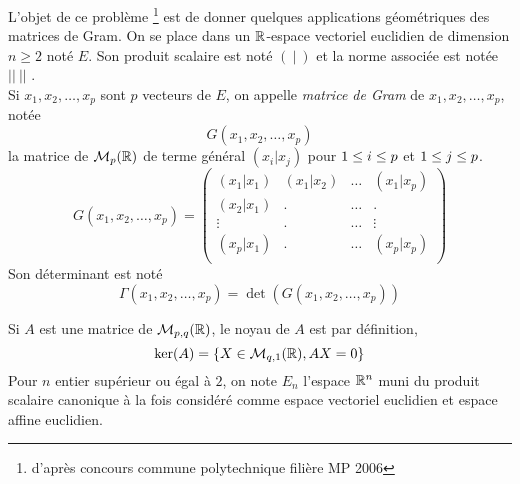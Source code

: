 L'objet de ce problème \footnote{d'après concours commune polytechnique filière MP 2006} est de donner quelques applications géométriques des matrices de Gram. On se place dans un $\mathbb{R}$-espace vectoriel euclidien de dimension $n\geq 2$ noté  $E$. Son produit scalaire est noté $(\ |\ )$ et la norme associée est notée $||\ ||$ .\\
Si $x_1,x_2,\dots, x_p$ sont $p$ vecteurs de $E$, on appelle \emph{matrice de Gram} de $x_1,x_2,\dots, x_p$, notée
\begin{displaymath}
 G(x_1,x_2,\dots, x_p)
\end{displaymath}
la matrice de $\mathcal{M}_p(\mathbb{R})$ de terme général $(x_i |x_j)$ pour $1\leq i\leq p$ et $1\leq j\leq p$.
\begin{displaymath}
G(x_1,x_2,\dots, x_p)=\left(\begin{array}{cccc}
                             (x_1|x_1)&  (x_1|x_2)& \dots &  (x_1|x_p) \\
                             (x_2|x_1) & . & \dots & .\\
                            \vdots & . & \dots & \vdots \\
                             (x_p|x_1) & . & \dots &  (x_p|x_p) \\
                          \end{array}
                        \right) 
\end{displaymath}
Son déterminant est noté
\begin{displaymath}
 \Gamma(x_1,x_2,\dots, x_p)= \det \left( G(x_1,x_2,\dots, x_p)\right) 
\end{displaymath}

Si $A$ est une matrice de $\mathcal{M}_{p,q}(\mathbb{R})$, le noyau de $A$  est par définition,
 $$\ker(A)=\{X\in \mathcal{M}_{q,1}(\mathbb{R}),AX=0\}$$
Pour $n$ entier supérieur ou égal à $2$, on note $E_n$ l'espace $\mathbb{R}^n$ muni du produit scalaire canonique à la fois considéré comme espace vectoriel
euclidien et espace affine euclidien.

